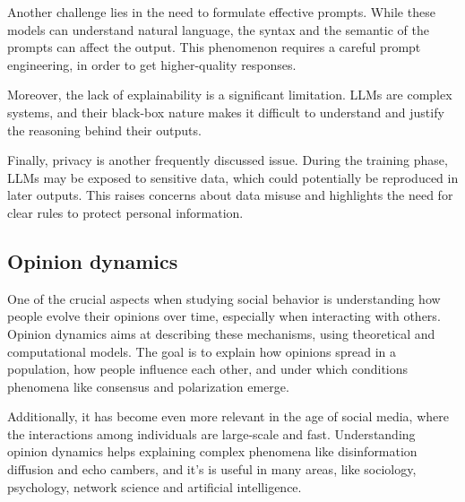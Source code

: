 Another challenge lies in the need to formulate effective prompts. While these models can understand natural language, the syntax and the semantic of the prompts can affect the output. This phenomenon requires a careful prompt engineering, in order to get higher-quality responses.

Moreover, the lack of explainability is a significant limitation. LLMs are complex systems, and their black-box nature makes it difficult to understand and justify the reasoning behind their outputs.

Finally, privacy is another frequently discussed issue. During the training phase, LLMs may be exposed to sensitive data, which could potentially be reproduced in later outputs. This raises concerns about data misuse and highlights the need for clear rules to protect personal information.


















\subsection{Opinion dynamics} %
One of the crucial aspects when studying social behavior is understanding how people evolve their opinions over time, especially when interacting with others.
Opinion dynamics aims at describing these mechanisms, using theoretical and computational models.
The goal is to explain how opinions spread in a population, how people influence each other, and under which conditions phenomena like consensus and polarization emerge.

Additionally, it has become even more relevant in the age of social media, where the interactions among individuals are large-scale and fast.
Understanding opinion dynamics helps explaining complex phenomena like disinformation diffusion and echo cambers, and it's is useful in many areas, like sociology, psychology, network science and artificial intelligence.


